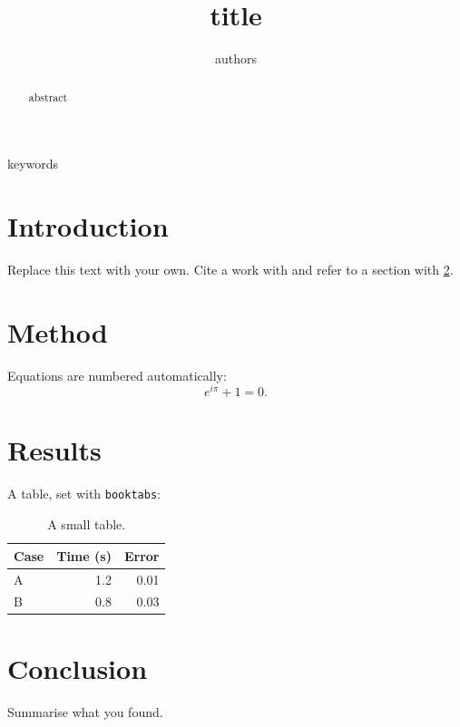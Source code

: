\documentclass[conference]{IEEEtran}
\title{{{title}}}
\author{{{authors}}}
\begin{document}
\maketitle
\begin{abstract}
{{abstract}}
\end{abstract}
\begin{IEEEkeywords}
{{keywords}}
\end{IEEEkeywords}

\section{Introduction}
Replace this text with your own. Cite a work with \cite{knuth1984} and refer to a
section with \ref{sec:method}.

\section{Method}\label{sec:method}
Equations are numbered automatically:
\begin{equation}
  e^{i\pi} + 1 = 0.
\end{equation}

\section{Results}
A table, set with \texttt{booktabs}:
\begin{table}[h]
  \centering
  \begin{tabular}{lrr}
    \toprule
    Case & Time (s) & Error \\
    \midrule
    A & 1.2 & 0.01 \\
    B & 0.8 & 0.03 \\
    \bottomrule
  \end{tabular}
  \caption{A small table.}
  \label{tab:results}
\end{table}

\section{Conclusion}
Summarise what you found.



\end{document}
